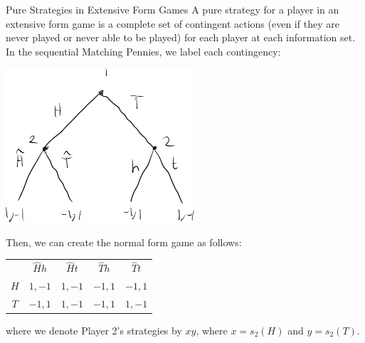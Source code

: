 \documentclass[10pt]{extarticle}
\begin{document}
  \begin{problem}{Pure Strategies in Extensive Form Games}
    A pure strategy for a player in an extensive form game is a complete set of contingent actions (even if they are never played or never able to be played) for each player at each information set. In the sequential Matching Pennies, we label each contingency:
    \begin{center}
      \includegraphics[width=7cm]{images/matching_pennies_pure_strategies.png}
    \end{center}
    Then, we can create the normal form game as follows:
    \begin{center}
      \renewcommand{\arraystretch}{1.5}
      \begin{tabular}{c|c|c|c|c|}
        \multicolumn{1}{c}{}& \multicolumn{1}{c}{$\hat{H}h$} & \multicolumn{1}{c}{$\hat{H}t$} & \multicolumn{1}{c}{$\hat{T}h$} & \multicolumn{1}{c}{$\hat{T}t$}\\
        \cline{2-5}
        $H$ & $1,-1$ & $1,-1$ & $-1,1$ & $-1,1$\\
        \cline{2-5}
        $T$ & $-1,1$ & $1,-1$ & $-1,1$ & $1,-1$\\
        \cline{2-5}
      \end{tabular}
    \end{center}
    where we denote Player 2's strategies by $xy$, where $x = s_2(H)$ and $y = s_2(T)$.\newline


\end{problem}
\end{document}
